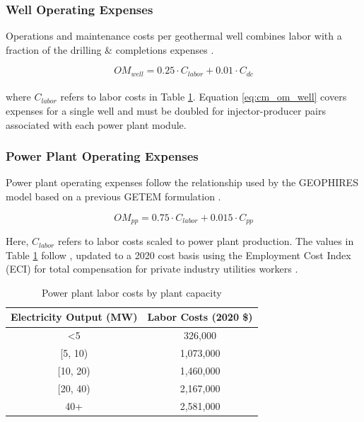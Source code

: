 \subsubsection{Well Operating Expenses}
\label{ch4:cm_opex_well}

Operations and maintenance costs per geothermal well combines labor with a fraction of the drilling \& completions expenses \citep[Equation 12,\ ][]{beckers_introducing_2013}.

\begin{equation}
\label{eq:cm_om_well}
    OM_{well} = 0.25 \cdot C_{labor} + 0.01 \cdot C_{dc}
\end{equation}
\\
where $C_{labor}$ refers to labor costs in Table \ref{tab:labor_costs}. Equation \ref{eq:cm_om_well} covers expenses for a single well and must be doubled for injector-producer pairs associated with each power plant module.
\subsubsection{Power Plant Operating Expenses}
\label{ch4:cm_opex_pp}

Power plant operating expenses follow the relationship used by the GEOPHIRES model based on a previous GETEM formulation \citep[Equation 9,\ ][]{beckers_introducing_2013}.

\begin{equation}
\label{eq:cm_om_pp}
    OM_{pp} = 0.75 \cdot C_{labor} + 0.015 \cdot C_{pp}
\end{equation}

Here, $C_{labor}$ refers to labor costs scaled to power plant production. The values in Table \ref{tab:labor_costs} follow \citet[Equation 10,\ ][]{beckers_introducing_2013}, updated to a 2020 cost basis using the Employment Cost Index (ECI) for total compensation for private industry utilities workers \citep{us_bls_eci_2021}.

\begin{table}[!htp]
\centering
\begin{tabular}{|c|c|}
\hline
\textbf{Electricity Output (MW)} & \textbf{Labor Costs (2020 \$)} \\ \hline
\textless 5 & 326,000 \\ \hline
{[}5, 10) & 1,073,000 \\ \hline
{[}10, 20) & 1,460,000 \\ \hline
{[}20, 40) & 2,167,000 \\ \hline
40+ & 2,581,000 \\ \hline
\end{tabular}
\caption[Power plant labor costs]{Power plant labor costs by plant capacity  \protect\citep{beckers_introducing_2013}}
\label{tab:labor_costs}
\end{table}

